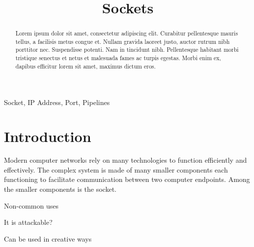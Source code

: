 \documentclass[conference, 12pt]{IEEEtran}
\begin{document}
\title{Sockets}

\author{
\and
{}
\and
{}
}

\maketitle

\begin{abstract}
    Lorem ipsum dolor sit amet, consectetur adipiscing elit. Curabitur pellentesque mauris tellus, a facilisis metus congue et. Nullam gravida laoreet justo, auctor rutrum nibh porttitor nec. Suspendisse potenti. Nam in tincidunt nibh. Pellentesque habitant morbi tristique senectus et netus et malesuada fames ac turpis egestas. Morbi enim ex, dapibus efficitur lorem sit amet, maximus dictum eros. 
\end{abstract}

\begin{IEEEkeywords}
Socket, IP Address, Port, Pipelines
\end{IEEEkeywords}

\section{Introduction}
Modern computer networks rely on many technologies to function efficiently and effectively. The complex system is made of many smaller components each functioning to facilitate communication between two computer endpoints. Among the smaller components is the socket.

Non-common uses

It is attackable?

Can be used in creative ways
\end{document}
